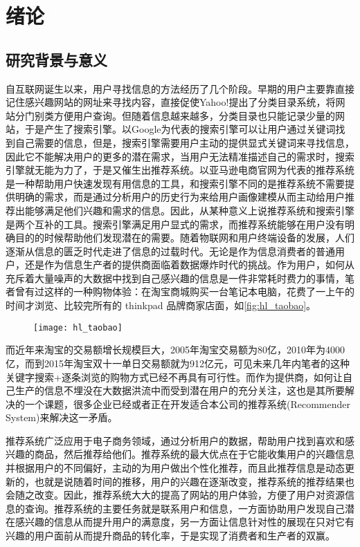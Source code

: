 ﻿
\chapter{绪论}
\label{chap:introduction}
\section{研究背景与意义}
	自互联网诞生以来，用户寻找信息的方法经历了几个阶段。早期的用户主要靠直接记住感兴趣网站的网址来寻找内容，直接促使Yahoo!提出了分类目录系统，将网站分门别类方便用户查询。但随着信息越来越多，分类目录也只能记录少量的网站，于是产生了搜索引擎。以Google为代表的搜索引擎可以让用户通过关键词找到自己需要的信息，但是，搜索引擎需要用户主动的提供显式关键词来寻找信息，因此它不能解决用户的更多的潜在需求，当用户无法精准描述自己的需求时，搜索引擎就无能为力了，于是又催生出推荐系统\citep{recmd-system}。以亚马逊电商官网为代表的推荐系统是一种帮助用户快速发现有用信息的工具，和搜索引擎不同的是推荐系统不需要提供明确的需求，而是通过分析用户的历史行为来给用户画像建模\citep{demo-data}从而主动给用户推荐出能够满足他们兴趣和需求的信息。因此，从某种意义上说推荐系统和搜索引擎是两个互补的工具。搜索引擎满足用户显式的需求，而推荐系统能够在用户没有明确目的的时候帮助他们发现潜在的需要。随着物联网和用户终端设备的发展，人们逐渐从信息的匮乏时代走进了信息的过载时代。无论是作为信息消费者的普通用户，还是作为信息生产者的提供商面临着数据爆炸时代的挑战。作为用户，如何从充斥着大量噪声的大数据中找到自己感兴趣的信息是一件非常耗时费力的事情，笔者曾有过这样的一种购物体验：在淘宝商城购买一台笔记本电脑，花费了一上午的时间才浏览、比较完所有的 thinkpad 品牌商家店面，如\autoref{fig:hl_taobao}。
	\begin{figure}
		\centering
		\texttt{[image: hl\_taobao]}
		\label{fig:hl_taobao}
	\end{figure}

	而近年来淘宝的交易额增长规模巨大，2005年淘宝交易额为80亿，2010年为4000亿，而到2015年淘宝双十一单日交易额就为912亿元，可见未来几年内笔者的这种关键字搜索+逐条浏览的购物方式已经不再具有可行性。而作为提供商，如何让自己生产的信息不埋没在大数据洪流中而受到潜在用户的充分关注，这也是其所要解决的一个课题，很多企业已经或者正在开发适合本公司的推荐系统(Recommender System)来解决这一矛盾。

	推荐系统广泛应用于电子商务领域，通过分析用户的数据，帮助用户找到喜欢和感兴趣的商品，然后推荐给他们。推荐系统的最大优点在于它能收集用户的兴趣信息并根据用户的不同偏好，主动的为用户做出个性化推荐，而且此推荐信息是动态更新的，也就是说随着时间的推移，用户的兴趣在逐渐改变，推荐系统的推荐结果也会随之改变。因此，推荐系统大大的提高了网站的用户体验，方便了用户对资源信息的查询。推荐系统的主要任务就是联系用户和信息，一方面协助用户发现自己潜在感兴趣的信息从而提升用户的满意度，另一方面让信息针对性的展现在只对它有兴趣的用户面前从而提升商品的转化率，于是实现了消费者和生产者的双赢。

